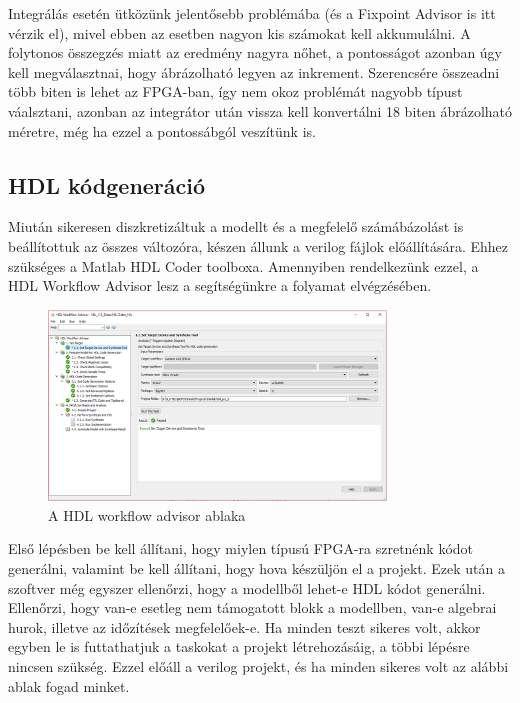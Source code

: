 Integrálás esetén ütközünk jelentősebb problémába (és a Fixpoint Advisor is itt vérzik el), mivel ebben az esetben nagyon kis számokat kell akkumulálni. A folytonos összegzés miatt az eredmény nagyra nőhet, a pontosságot azonban úgy kell megválasztnai, hogy ábrázolható legyen az inkrement. Szerencsére összeadni több biten is lehet az FPGA-ban, így nem okoz problémát nagyobb típust váalsztani, azonban az integrátor után vissza kell konvertálni 18 biten ábrázolható méretre, még ha ezzel a pontossábgól veszítünk is.

\subsection{HDL kódgeneráció}

Miután sikeresen diszkretizáltuk a modellt és a megfelelő számábázolást is beállítottuk az összes változóra, készen állunk a verilog fájlok előállítására. Ehhez szükséges a Matlab HDL Coder toolboxa. Amennyiben rendelkezünk ezzel, a HDL Workflow Advisor lesz a segítségünkre a folyamat elvégzésében.

\begin{figure}[h!]
	\centering
	\includegraphics[width = 0.8\textwidth]{figures/hdl_advisor.png}
	\caption{A HDL workflow advisor ablaka} 
	\label{fig:hdl_advisor}
\end{figure}

Első lépésben be kell állítani, hogy miylen típusú FPGA-ra szretnénk kódot generálni, valamint be kell állítani, hogy hova készüljön el a projekt. Ezek után a szoftver még egyszer ellenőrzi, hogy a modellből lehet-e HDL kódot generálni. Ellenőrzi, hogy van-e esetleg nem támogatott blokk a modellben, van-e algebrai hurok, illetve az időzítések megfelelőek-e. Ha minden teszt sikeres volt, akkor egyben le is futtathatjuk a taskokat a projekt létrehozásáig, a többi lépésre nincsen szükség. Ezzel előáll a verilog projekt, és ha minden sikeres volt az alábbi ablak fogad minket.

